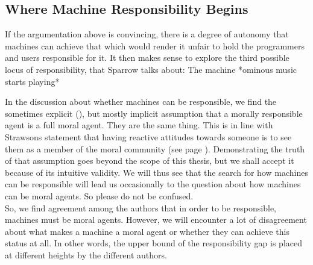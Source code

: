 \documentclass{article}
\begin{document}




\subsection{Where Machine Responsibility Begins}

If the argumentation above is convincing, there is a degree of autonomy that
machines can achieve that which would render it unfair to hold the programmers and users
responsible for it. It then makes sense to explore the third possible locus of
responsibility, that Sparrow talks about: The machine *ominous music starts
playing*

In the discussion about whether machines can be responsible, we find the
sometimes explicit (\cite[p.  489]{SmithVickers2021}), but mostly implicit
assumption that a morally responsible agent is a full moral agent. They are
the same thing. This is in line with Strawsons statement that having reactive
attitudes towards someone is to see them as a member of the moral community
(see page \pageref{responsibility_implies_agency}). Demonstrating the truth of
that assumption goes beyond the scope of this thesis, but we shall accept it
because of its intuitive validity. We will thus see that the search for how
machines can be responsible will lead us occasionally to the question about
how machines can be moral agents. So please do not be confused.\\
So, we find agreement among the authors that in order to be responsible,
machines must be moral agents. However, we will encounter a lot of disagreement
about what makes a machine a moral agent or whether they can achieve this status
at all. In other words, the upper bound of the responsibility gap is placed at
different heights by the different authors.
\end{document}
